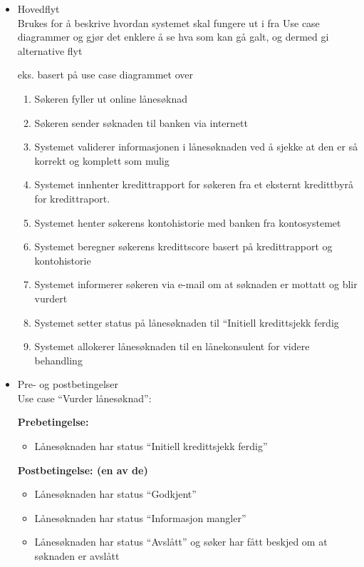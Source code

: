 \documentclass[11pt]{article}
\begin{document}
\begin{itemize}

\item Hovedflyt\\
\label{sec-7.2.1.1}%
Brukes for å beskrive hvordan systemet skal fungere ut i fra Use case diagrammer
     og gjør det enklere å se hva som kan gå galt, og dermed gi alternative flyt

     eks. basert på use case diagrammet over

\begin{enumerate}
\item Søkeren fyller ut online lånesøknad
\item Søkeren sender søknaden til banken via internett
\item Systemet validerer informasjonen i lånesøknaden ved å 
        sjekke at den er så korrekt og komplett som mulig
\item Systemet innhenter kredittrapport for søkeren fra et
        eksternt kredittbyrå for kredittraport.
\item Systemet henter søkerens kontohistorie med banken
        fra kontosystemet
\item Systemet beregner søkerens kredittscore basert på
        kredittrapport og kontohistorie
\item Systemet informerer søkeren via e-mail om at søknaden 
        er mottatt og blir vurdert
\item Systemet setter status på lånesøknaden til ``Initiell
        kredittsjekk ferdig
\item Systemet allokerer lånesøknaden til en lånekonsulent 
        for videre behandling
\end{enumerate}


\item Pre- og postbetingelser\\
\label{sec-7.2.1.2}%
Use case ``Vurder lånesøknad'':

     \textbf{Prebetingelse:}
\begin{itemize}
\item Lånesøknaden har status ``Initiell kredittsjekk ferdig''
\end{itemize}
     \textbf{Postbetingelse: (en av de)}
\begin{itemize}
\item Lånesøknaden har status ``Godkjent''
\item Lånesøknaden har status ``Informasjon mangler''
\item Lånesøknaden har status ``Avslått'' og søker har fått
       beskjed om at søknaden er avslått
\end{itemize}
    
\end{itemize} %
\end{document}
